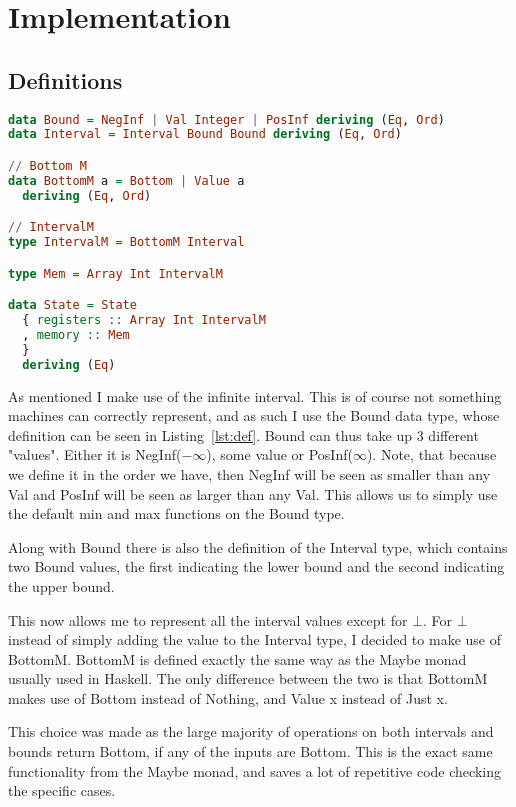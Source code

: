 \section{Implementation}

\subsection{Definitions}\label{sec:def}
\begin{lstlisting}[language={haskell}, caption={Bound data type}, label={lst:def}]
data Bound = NegInf | Val Integer | PosInf deriving (Eq, Ord)
data Interval = Interval Bound Bound deriving (Eq, Ord)

// Bottom M
data BottomM a = Bottom | Value a
  deriving (Eq, Ord)

// IntervalM
type IntervalM = BottomM Interval

type Mem = Array Int IntervalM

data State = State
  { registers :: Array Int IntervalM
  , memory :: Mem
  }
  deriving (Eq)
\end{lstlisting}
As mentioned I make use of the infinite interval. This is of course not
something machines can correctly represent, and as such I use the Bound data
type, whose definition can be seen in Listing~\ref{lst:def}. Bound can thus
take up 3 different "values". Either it is NegInf($-\infty$), some value or
PosInf($\infty$). Note, that because we define it in the order we have, then
NegInf will be seen as smaller than any Val and PosInf will be seen as larger
than any Val. This allows us to simply use the default min and max functions on
the Bound type.

Along with Bound there is also the definition of the Interval type, which
contains two Bound values, the first indicating the lower bound and the second
indicating the upper bound.

This now allows me to represent all the interval values except for $\bot$. For
$\bot$ instead of simply adding the value to the Interval type, I decided to
make use of BottomM. BottomM is defined exactly the same way as the Maybe monad
usually used in Haskell. The only difference between the two is that BottomM
makes use of Bottom instead of Nothing, and Value x instead of Just x.

This choice was made as the large majority of operations on both intervals and
bounds return Bottom, if any of the inputs are Bottom. This is the exact same
functionality from the Maybe monad, and saves a lot of repetitive code checking
the specific cases.

